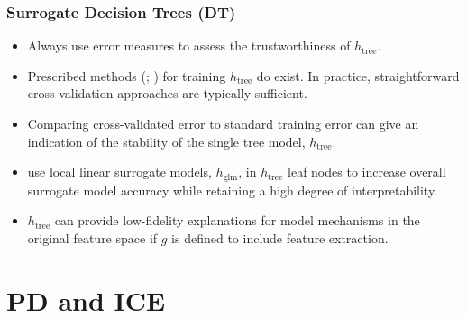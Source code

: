 \documentclass[11pt, 
               aspectratio=169
               ]{beamer}
\begin{document}
		\begin{frame}
		
			\frametitle{Surrogate Decision Trees (DT)}
			
			\vspace{-10 pt}
			
			\begin{itemize}
				
				\item Always use error measures to assess the trustworthiness of $h_{\text{tree}}$.
	
				\item Prescribed methods (\cite{dt_surrogate1}; \cite{dt_surrogate2}) for training $h_{\text{tree}}$ do exist. In practice, straightforward cross-validation approaches are typically sufficient. 
				
				\item Comparing cross-validated error to standard training error can give an indication of the stability of the single tree model, $h_{\text{tree}}$.
				
				\item \cite{lime-sup} use local linear surrogate models, $h_{\text{glm}}$, in $h_{\text{tree}}$ leaf nodes to increase overall surrogate model accuracy while retaining a high degree of interpretability.
	
				\item $h_{\text{tree}}$ can provide low-fidelity explanations for model mechanisms in the original feature space if $g$ is defined to include feature extraction.
				
			\end{itemize}
			
		\end{frame}

	\section{PD and ICE}
\end{document}
